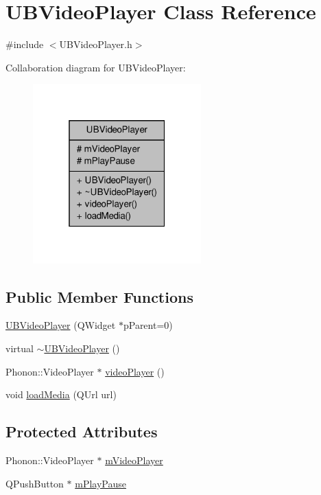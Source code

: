 \hypertarget{class_u_b_video_player}{\section{U\-B\-Video\-Player Class Reference}
\label{de/dd2/class_u_b_video_player}
}


{\ttfamily \#include $<$U\-B\-Video\-Player.\-h$>$}



Collaboration diagram for U\-B\-Video\-Player\-:
\nopagebreak
\begin{figure}[H]
\begin{center}
\leavevmode
\includegraphics[width=184pt]{d2/daf/class_u_b_video_player__coll__graph}
\end{center}
\end{figure}
\subsection*{Public Member Functions}
\begin{DoxyCompactItemize}
\item 
\hyperlink{class_u_b_video_player_a32e227574bb587a245cbc69033f4e6c3}{U\-B\-Video\-Player} (Q\-Widget $\ast$p\-Parent=0)
\item 
virtual \hyperlink{class_u_b_video_player_a4350d927c120d9c60fe6d7af43d7585d}{$\sim$\-U\-B\-Video\-Player} ()
\item 
Phonon\-::\-Video\-Player $\ast$ \hyperlink{class_u_b_video_player_a33e76a6103b1318f6a0e4f2cf03e8e50}{video\-Player} ()
\item 
void \hyperlink{class_u_b_video_player_a352228a5ce7fae3c182413731407de96}{load\-Media} (Q\-Url url)
\end{DoxyCompactItemize}
\subsection*{Protected Attributes}
\begin{DoxyCompactItemize}
\item 
Phonon\-::\-Video\-Player $\ast$ \hyperlink{class_u_b_video_player_aebf986633fcfa6964c7b6cc45e691c63}{m\-Video\-Player}
\item 
Q\-Push\-Button $\ast$ \hyperlink{class_u_b_video_player_a7c84b8b830aa3ca9fc0b72fc7f0d062c}{m\-Play\-Pause}
\end{DoxyCompactItemize}



